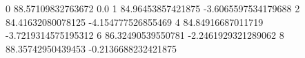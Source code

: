 0 88.57109832763672 0.0
1 84.96453857421875 -3.6065597534179688
2 84.41632080078125 -4.154777526855469
4 84.84916687011719 -3.7219314575195312
6 86.32490539550781 -2.2461929321289062
8 88.35742950439453 -0.2136688232421875

